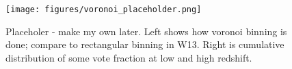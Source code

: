 \begin{figure}
\centering
\texttt{[image: figures/voronoi\_placeholder.png]}
\caption{Placeholer - make my own later. Left shows how voronoi binning is done; compare to rectangular binning in W13. Right is cumulative distribution of some vote fraction at low and high redshift.}
\label{fig:voronoi}
\end{figure}








